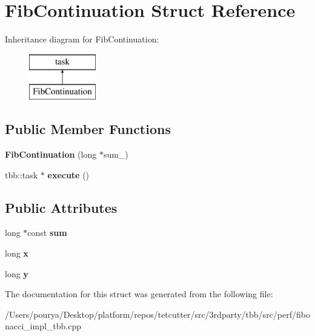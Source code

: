 \hypertarget{structFibContinuation}{}\section{Fib\+Continuation Struct Reference}
\label{structFibContinuation}
Inheritance diagram for Fib\+Continuation\+:\begin{figure}[H]
\begin{center}
\leavevmode
\includegraphics[height=2.000000cm]{structFibContinuation}
\end{center}
\end{figure}
\subsection*{Public Member Functions}
\begin{DoxyCompactItemize}
\item 
\hypertarget{structFibContinuation_afe5677fe3ba27d1f9a782608eea78c44}{}{\bfseries Fib\+Continuation} (long $\ast$sum\+\_\+)\label{structFibContinuation_afe5677fe3ba27d1f9a782608eea78c44}

\item 
\hypertarget{structFibContinuation_a2b47262bc0a36bdd2fa969ae832a6753}{}tbb\+::task $\ast$ {\bfseries execute} ()\label{structFibContinuation_a2b47262bc0a36bdd2fa969ae832a6753}

\end{DoxyCompactItemize}
\subsection*{Public Attributes}
\begin{DoxyCompactItemize}
\item 
\hypertarget{structFibContinuation_ab497ff1735d8f78191aff89eb011e704}{}long $\ast$const {\bfseries sum}\label{structFibContinuation_ab497ff1735d8f78191aff89eb011e704}

\item 
\hypertarget{structFibContinuation_a2c00e599d6630941f2ad7c3d4c1f40d2}{}long {\bfseries x}\label{structFibContinuation_a2c00e599d6630941f2ad7c3d4c1f40d2}

\item 
\hypertarget{structFibContinuation_a68980b9dc8b8aeb532d4499cc7262b83}{}long {\bfseries y}\label{structFibContinuation_a68980b9dc8b8aeb532d4499cc7262b83}

\end{DoxyCompactItemize}


The documentation for this struct was generated from the following file\+:\begin{DoxyCompactItemize}
\item 
/\+Users/pourya/\+Desktop/platform/repos/tetcutter/src/3rdparty/tbb/src/perf/fibonacci\+\_\+impl\+\_\+tbb.\+cpp\end{DoxyCompactItemize}
